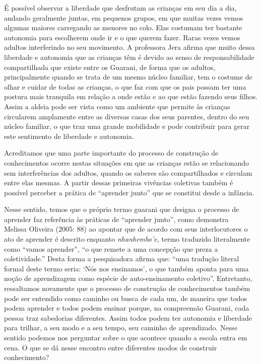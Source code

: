 É possível observar a liberdade que desfrutam as crianças em seu dia a
dia, andando geralmente juntas, em pequenos grupos, em que muitas vezes
vemos algumas maiores carregando as menores no colo. Elas costumam ter
bastante autonomia para escolherem onde ir e o que querem fazer. Raras
vezes vemos adultos interferindo no seu movimento. A professora Jera
afirma que muito dessa liberdade e autonomia que as crianças têm é
devido ao senso de responsabilidade compartilhada que existe entre os
Guarani, de forma que os adultos, principalmente quando se trata de um
mesmo núcleo familiar, tem o costume de olhar e cuidar de todas as
crianças, o que faz com que os pais possam ter uma postura mais
tranquila em relação a onde estão e ao que estão fazendo seus filhos.
Assim a aldeia pode ser vista como um ambiente que permite às crianças
circularem amplamente entre as diversas casas dos seus parentes, dentro
do seu núcleo familiar, o que traz uma grande mobilidade e pode
contribuir para gerar este sentimento de liberdade e autonomia.

Acreditamos que uma parte importante do processo de construção de
conhecimentos ocorre nestas situações em que as crianças estão se
relacionando sem interferências dos adultos, quando os saberes são
compartilhados e circulam entre elas mesmas. A partir dessas primeiras
vivências coletivas também é possível perceber a prática de ``aprender
junto'' que se constitui desde a infância.

Nesse sentido, temos que o próprio termo guarani que designa o processo
de aprender faz referência às práticas de ``aprender junto'', como
demonstra\\
Melissa Oliveira (2005: 88) ao apontar que de acordo com seus
interlocutores o ato de aprender é descrito enquanto \emph{nhanhembo'e},
termo traduzido literalmente como ``vamos aprender'', ``o que remete a
uma concepção que preza a coletividade.'' Desta forma a pesquisadora
afirma que: ``uma tradução literal formal deste termo seria: `Nós nos
ensinamos', o que também aponta para uma noção de aprendizagem como
espécie de auto-ensinamento coletivo''. Entretanto, ressaltamos
novamente que o processo de construção de conhecimentos também pode ser
entendido como caminho ou busca de cada um, de maneira que todos podem
aprender e todos podem ensinar porque, na compreensão Guarani, cada
pessoa traz sabedorias diferentes. Assim todos podem ter autonomia e
liberdade para trilhar, a seu modo e a seu tempo, seu caminho de
aprendizado. Nesse sentido podemos nos perguntar sobre o que acontece
quando a escola entra em cena. O que se dá nesse encontro entre
diferentes modos de construir conhecimento?

